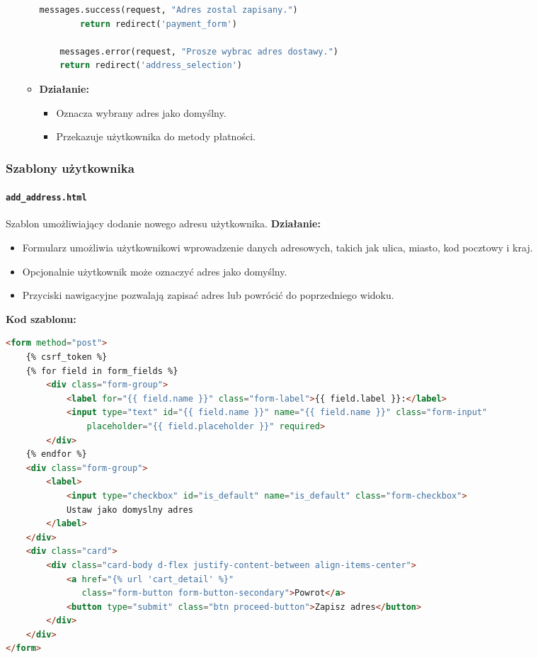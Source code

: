 \documentclass[12pt,a4paper,oneside]{article}
\theoremstyle{definition}
\numberwithin{equation}{section}
\begin{document}
\begin{itemize}
\begin{itemize}
\begin{lstlisting}[language=Python, caption=Metoda \texttt{post} w \texttt{AddressSelectionView}]
        messages.success(request, "Adres zostal zapisany.")
        return redirect('payment_form')

    messages.error(request, "Prosze wybrac adres dostawy.")
    return redirect('address_selection')
        \end{lstlisting}
    \item \textbf{Działanie:}
    \begin{itemize}
        \item Oznacza wybrany adres jako domyślny.
        \item Przekazuje użytkownika do metody płatności.
    \end{itemize}
    \end{itemize}
\end{itemize}

\subsubsection*{Szablony użytkownika}

\paragraph{\texttt{add\_address.html}}
\label{sec:add_address_template}
Szablon umożliwiający dodanie nowego adresu użytkownika.  
\textbf{Działanie:}
\begin{itemize}
    \item Formularz umożliwia użytkownikowi wprowadzenie danych adresowych, takich jak ulica, miasto, kod pocztowy i kraj.
    \item Opcjonalnie użytkownik może oznaczyć adres jako domyślny.
    \item Przyciski nawigacyjne pozwalają zapisać adres lub powrócić do poprzedniego widoku.
\end{itemize}
\textbf{Kod szablonu:}
\begin{lstlisting}[language=HTML, caption=Szablon add\_address.html]
<form method="post">
    {% csrf_token %}
    {% for field in form_fields %}
        <div class="form-group">
            <label for="{{ field.name }}" class="form-label">{{ field.label }}:</label>
            <input type="text" id="{{ field.name }}" name="{{ field.name }}" class="form-input"
                placeholder="{{ field.placeholder }}" required>
        </div>
    {% endfor %}
    <div class="form-group">
        <label>
            <input type="checkbox" id="is_default" name="is_default" class="form-checkbox">
            Ustaw jako domyslny adres
        </label>
    </div>
    <div class="card">
        <div class="card-body d-flex justify-content-between align-items-center">
            <a href="{% url 'cart_detail' %}"
               class="form-button form-button-secondary">Powrot</a>
            <button type="submit" class="btn proceed-button">Zapisz adres</button>
        </div>
    </div>
</form>
\end{lstlisting}
\end{document}
